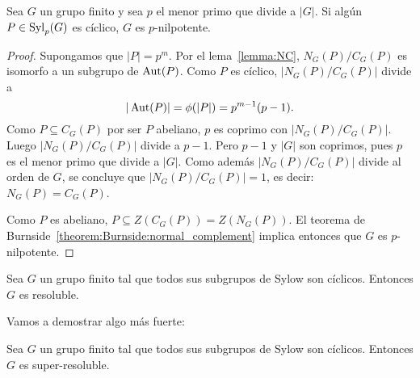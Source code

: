 \begin{corollary}
	\label{corollary:Sylow_ciclico}
	Sea $G$ un grupo finito y sea $p$ el menor primo que divide a $|G|$. Si
	algún $P\in\mathrm{Syl}_p(G)$ es cíclico, $G$ es $p$-nilpotente.
\end{corollary}

\begin{proof}
	Supongamos que $|P|=p^m$.  Por el lema~\ref{lemma:NC}, $N_G(P)/C_G(P)$ es
	isomorfo a un subgrupo de $\operatorname{Aut}(P)$. Como $P$ es cíclico, $|N_G(P)/C_G(P)|$ divide a 
	\[
		|\operatorname{Aut}(P)|=\phi(|P|)=p^{m-1}(p-1).
	\]
	Como $P\subseteq C_G(P)$ por ser $P$ abeliano, $p$ es coprimo con
	$|N_G(P)/C_G(P)|$.  Luego $|N_G(P)/C_G(P)|$ divide a $p-1$. Pero $p-1$ y
	$|G|$ son coprimos, pues $p$ es el menor primo que divide a $|G|$.  Como
	además $|N_G(P)/C_G(P)|$ divide al orden de $G$, se concluye que
	$|N_G(P)/C_G(P)|=1$, es decir: $N_G(P)=C_G(P)$. 

	Como $P$ es abeliano, $P\subseteq Z(C_G(P))=Z(N_G(P))$. El teorema de
	Burnside~\ref{theorem:Burnside:normal_complement} implica entonces que $G$
	es $p$-nilpotente. 
\end{proof}

\begin{exercise}
	Sea $G$ un grupo finito tal que todos sus subgrupos de Sylow son cíclicos.
	Entonces $G$ es resoluble.
\end{exercise}

Vamos a demostrar algo más fuerte:

\begin{corollary}
	\label{corollary:Sylow_ciclicos:resoluble}
	Sea $G$ un grupo finito tal que todos sus subgrupos de Sylow son cíclicos.
	Entonces $G$ es super-resoluble.
\end{corollary}


